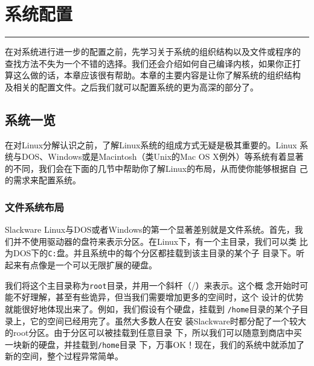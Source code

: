 
\chapter{系统配置}
\label{chap:systemConfig}

\begin{flushleft}
\rule[0mm]{\textwidth}{.1pt}
\end{flushleft}

在对系统进行进一步的配置之前，先学习关于系统的组织结构以及文件或程序的
查找方法不失为一个不错的选择。我们还会介绍如何自己编译内核，如果你正打
算这么做的话，本章应该很有帮助。本章的主要内容是让你了解系统的组织结构
及相关的配置文件。之后我们就可以配置系统的更为高深的部分了。

\section{系统一览}
\label{sec:systemConfig:systemOverview}

在对Linux分解认识之前，了解Linux系统的组成方式无疑是极其重要的。Linux
系统与DOS、Windows或是Macintosh（类Unix的Mac OS X例外）等系统有着显著
的不同，我们会在下面的几节中帮助你了解Linux的布局，从而使你能够根据自
己的需求来配置系统。

\subsection{文件系统布局}
\label{sec:systemConfig:systemOverview:fileSystemLayout}

Slackware Linux与DOS或者Windows的第一个显著差别就是文件系统。首先，我
们并不使用驱动器的盘符来表示分区。在Linux下，有一个主目录，我们可以类
比为DOS下的\texttt{C:}盘。并且系统中的每个分区都挂载到该主目录的某个子
目录下。听起来有点像是一个可以无限扩展的硬盘。

我们将这个主目录称为\texttt{root}目录，并用一个斜杆（/）来表示。这个概
念开始时可能不好理解，甚至有些诡异，但当我们需要增加更多的空间时，这个
设计的优势就能很好地体现出来了。例如，我们假设有个硬盘，挂载到
\texttt{/home}目录的某个子目录上，它的空间已经用完了。虽然大多数人在安
装Slackware时都分配了一个较大的root分区。由于分区可以被挂载到任意目录
下，所以我们可以随意到商店中买一块新的硬盘，并挂载到\texttt{/home}目录
下，万事OK！现在，我们的系统中就添加了新的空间，整个过程异常简单。

